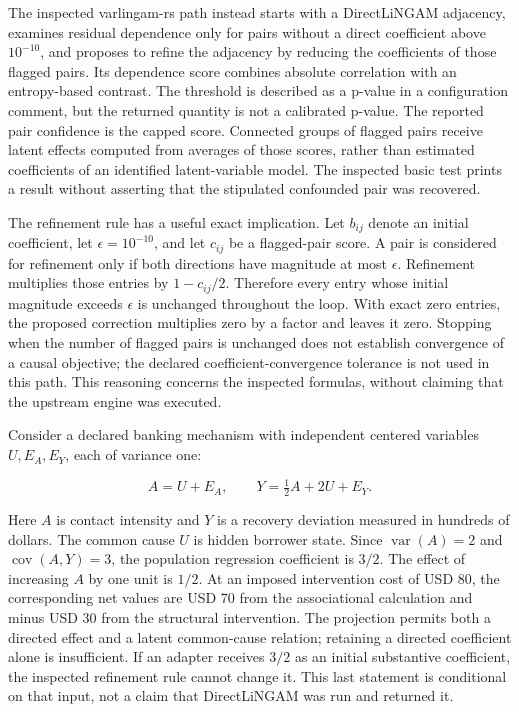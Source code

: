 The inspected varlingam-rs path instead starts with a DirectLiNGAM
adjacency, examines residual dependence only for pairs without a direct
coefficient above \(10^{-10}\), and proposes to refine the adjacency by
reducing the coefficients of those flagged pairs. Its dependence score
combines absolute correlation with an entropy-based contrast. The
threshold is described as a p-value in a configuration comment, but the
returned quantity is not a calibrated p-value. The reported pair
confidence is the capped score. Connected groups of flagged pairs
receive latent effects computed from averages of those scores, rather
than estimated coefficients of an identified latent-variable model. The
inspected basic test prints a result without asserting that the
stipulated confounded pair was recovered.
\citep{exec14_olatent_varlingam}

The refinement rule has a useful exact implication. Let \(b_{ij}\)
denote an initial coefficient, let \(\epsilon=10^{-10}\), and let
\(c_{ij}\) be a flagged-pair score. A pair is considered for refinement
only if both directions have magnitude at most \(\epsilon\). Refinement
multiplies those entries by \(1-c_{ij}/2\). Therefore every entry whose
initial magnitude exceeds \(\epsilon\) is unchanged throughout the loop.
With exact zero entries, the proposed correction multiplies zero by a
factor and leaves it zero. Stopping when the number of flagged pairs is
unchanged does not establish convergence of a causal objective; the
declared coefficient-convergence tolerance is not used in this path.
This reasoning concerns the inspected formulas, without claiming that
the upstream engine was executed.
\citep{exec14_olatent_varlingam,exec14_olatent_oracle}

Consider a declared banking mechanism with independent centered
variables \(U,E_A,E_Y\), each of variance one:

\[
A=U+E_A,\qquad Y=\tfrac12 A+2U+E_Y.
\]

Here \(A\) is contact intensity and \(Y\) is a recovery deviation
measured in hundreds of dollars. The common cause \(U\) is hidden
borrower state. Since \(\operatorname{var}(A)=2\) and
\(\operatorname{cov}(A,Y)=3\), the population regression coefficient is
\(3/2\). The effect of increasing \(A\) by one unit is \(1/2\). At an
imposed intervention cost of USD 80, the corresponding net values are
USD 70 from the associational calculation and minus USD 30 from the
structural intervention. The projection permits both a directed effect
and a latent common-cause relation; retaining a directed coefficient
alone is insufficient. If an adapter receives \(3/2\) as an initial
substantive coefficient, the inspected refinement rule cannot change it.
This last statement is conditional on that input, not a claim that
DirectLiNGAM was run and returned it. \citep{exec14_olatent_oracle}

